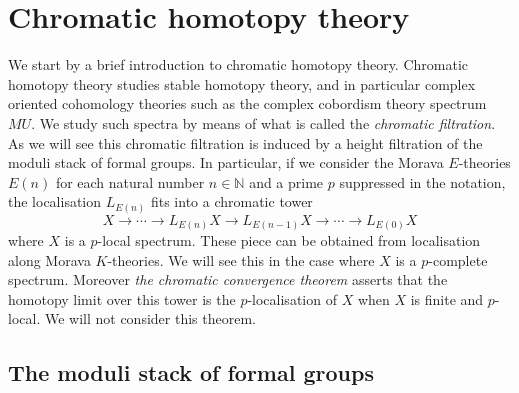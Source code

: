 \documentclass[a4paper]{article} %
\theoremstyle{definition}
\newcommand{\toWithMapLong}[1]{\overset{#1}{\longrightarrow}}
\newcommand{\N}{\mathbb{N}}
\begin{document}
\section{Chromatic homotopy theory}\label{Section:chromhtpytheory}

We start by a brief introduction to chromatic homotopy theory. Chromatic homotopy theory studies stable homotopy theory, and in particular complex oriented cohomology theories such as the complex cobordism theory spectrum $MU$. We study such spectra by means of what is called the \textit{chromatic filtration}. As we will see this chromatic filtration is induced by a height filtration of the moduli stack of formal groups. In particular, if we consider the Morava $E$-theories $E(n)$ for each natural number $n \in \N$ and a prime $p$ suppressed in the notation, the localisation $L_{E(n)}$ fits into a chromatic tower
\[
X \toWithMapLong{} \cdots \toWithMapLong{} L_{E(n)}X \toWithMapLong{} L_{E(n-1)}X \toWithMapLong{} \cdots \toWithMapLong{} L_{E(0)}X
\]
where $X$ is a $p$-local spectrum. These piece can be obtained from localisation along Morava $K$-theories. We will see this in the case where $X$ is a $p$-complete spectrum. Moreover \textit{the chromatic convergence theorem} asserts that the homotopy limit over this tower is the $p$-localisation of $X$ when $X$ is finite and $p$-local. We will not consider this theorem.

\subsection{The moduli stack of formal groups}
\end{document}
